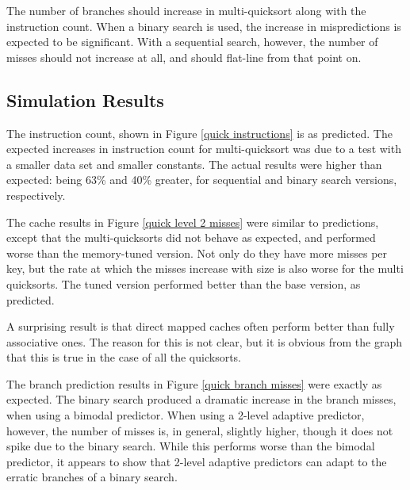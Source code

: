 The number of branches should increase in multi-quicksort along with the
instruction count. When a binary search is used, the increase in mispredictions
is expected to be significant. With a sequential search, however, the number of
misses should not increase at all, and should flat-line from that point on.

\subsection{Simulation Results}


The instruction count, shown in Figure \ref{quick instructions} is as
predicted. The expected increases in instruction count for multi-quicksort was
due to a test with a smaller data set and smaller constants. The actual results
were higher than expected: being 63\% and 40\% greater, for
sequential and binary search versions, respectively.

The cache results in Figure \ref{quick level 2 misses} were similar to
predictions, except that the multi-quicksorts did not behave as expected, and
performed worse than the memory-tuned version. Not only do they have more
misses per key, but the rate at which the misses increase with size is also
worse for the multi quicksorts. The tuned version performed better than the
base version, as predicted.

A surprising result is that direct mapped caches often perform better than fully
associative ones. The reason for this is not clear, but it is obvious from the
graph that this is true in the case of all the quicksorts.

The branch prediction results in Figure \ref{quick branch misses} were exactly
as expected. The binary search produced a dramatic increase in the branch
misses, when using a bimodal predictor. When using a 2-level adaptive predictor,
however, the number of misses is, in general, slightly higher, though it does
not spike due to the binary search. While this performs worse than the bimodal
predictor, it appears to show that 2-level adaptive predictors can adapt to the
erratic branches of a binary search.

